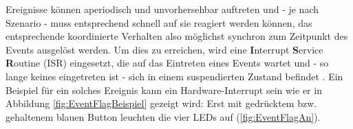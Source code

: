 \documentclass{llncs}
\begin{document}
Ereignisse können aperiodisch und unvorhersehbar auftreten und - je nach Szenario - muss entsprechend schnell auf sie reagiert werden können, das entsprechende koordinierte Verhalten also möglichst synchron zum Zeitpunkt des Events ausgelöst werden. Um dies zu erreichen, wird eine \textbf{I}nterrupt \textbf{S}ervice \textbf{R}outine (ISR) eingesetzt, die auf das Eintreten eines Events wartet und - so lange keines eingetreten ist - sich in einem suspendierten Zustand befindet \autocite[vgl.][87]{Cooling2017}. Ein Beispiel für ein solches Ereignis kann ein Hardware-Interrupt sein wie er in Abbildung \ref{fig:EventFlagBeispiel} gezeigt wird: Erst mit gedrücktem bzw. gehaltenem blauen Button leuchten die vier LEDs auf (\ref{fig:EventFlagAn}).\\
\end{document}
